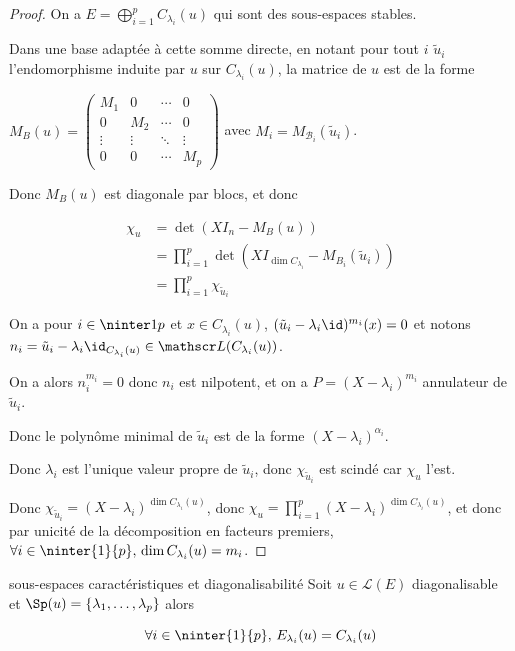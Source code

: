 \begin{proof}
    On a $E = \displaystyle \bigoplus_{i = 1 }^{ p } C_{\lambda_i}(u)$ qui sont 
    des sous-espaces stables. 

    Dans une base adaptée à cette somme directe, en notant pour tout $i$ 
    $\tilde u_i$ l'endomorphisme induite par $u$ sur $C_{\lambda_i}(u)$, la 
    matrice de $u$ est de la forme

    $M_B(u) = \begin{pmatrix}
        M_1 & 0 & \cdots & 0 \\
        0 & M_2 & \cdots & 0 \\
        \vdots & \vdots & \ddots & \vdots \\
        0 & 0 & \cdots & M_p
    \end{pmatrix}$ avec $M_i = M_{\mathcal B_i}(\tilde u_i)$.

    Donc $M_B(u)$ est diagonale par blocs, et donc 

    \begin{align}
        \chi_u & = \det (X I_n - M_B(u)) \\
        & = \prod_{i = 1 }^{ p } \det (X I_{\dim C_{\lambda_i}} - M_{B_i}(\tilde u_i)) \\
        & = \prod_{i = 1 }^{ p } \chi_{\tilde u_i}
    \end{align}

    On a pour $i \in \ninter 1 p$ et $x \in C_{\lambda_i}(u)$,
    $(\tilde u_i - \lambda_i \id)^{m_i}(x) = 0$ et notons $n_i = \tilde u_i - \lambda_i \id_{C_{\lambda_i}(u)} \in \mathscr L(C_{\lambda_i}(u))$.

    On a alors $n_i^{m_i} = 0$ donc $n_i$ est nilpotent, et on a 
    $P = (X - \lambda_i)^{m_i}$ annulateur de $\tilde u_i$.

    Donc le polynôme minimal de $\tilde u_i$ est de la forme $(X - \lambda_i)^{\alpha_i}$.

    Donc $\lambda_i$ est l'unique valeur propre de $\tilde u_i$, donc $\chi_{\tilde u_i}$ 
    est scindé car $\chi_u$ l'est. 

    Donc $\chi_{\tilde u_i} = (X - \lambda_i)^{\dim C_{\lambda_i}(u)}$, donc 
    $\displaystyle \chi_u = \prod_{i = 1 }^{ p } (X - \lambda_i)^{\dim C_{\lambda_i}(u)}$, 
    et donc par unicité de la décomposition en facteurs premiers,
    $\forall i \in \ninter{1}{p}, \, \dim C_{\lambda_i}(u) = m_i$.
\end{proof}

\begin{corollaire}{sous-espaces caractéristiques et diagonalisabilité}{}
    Soit $u \in \mathscr L(E)$ diagonalisable et $\Sp (u) = \{\lambda_1, \ldots, \lambda_p\}$
    alors 
    
    $$\forall i \in \ninter{1}{p}, \, E_{\lambda_i}(u) = C_{\lambda_i}(u)$$
\end{corollaire}


